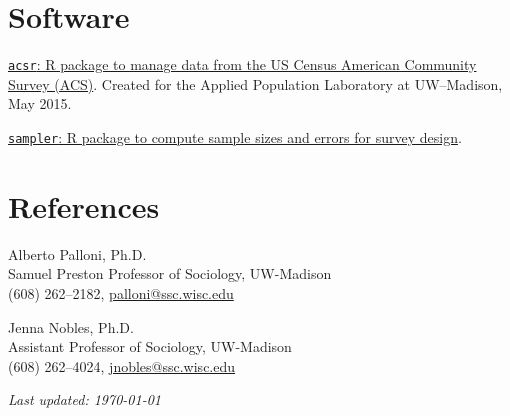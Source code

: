 \documentclass[10pt,letterpaper]{article}
\renewenvironment{itemize}{
  \begin{list}{}{
    \setlength{\leftmargin}{1.5em}
    \setlength{\itemsep}{0.25em}
    \setlength{\parskip}{0pt}
    \setlength{\parsep}{0.25em}
  }
}{
  \end{list}
}
\begin{document}
\section*{Software}

\begin{itemize}
\item \href{https://github.com/sdaza/acsr}{\texttt{acsr}: R package to manage data from the US Census American Community Survey (ACS)}. Created for the Applied Population Laboratory at UW--Madison, May 2015.
\item \href{https://github.com/sdaza/sampler}{\texttt{sampler}: R package to compute sample sizes and errors for survey design}.
\end{itemize}

\section*{References}

\begin{itemize}
\item Alberto Palloni, Ph.D.\\
Samuel Preston Professor of Sociology, UW-Madison\\
(608) 262--2182, \href{mailto:palloni@ssc.wisc.edu}{palloni@ssc.wisc.edu}

\item Jenna Nobles, Ph.D.\\
Assistant Professor of Sociology, UW-Madison\\
(608) 262--4024, \href{mailto:jnobles@ssc.wisc.edu}{jnobles@ssc.wisc.edu}
\end{itemize}

\bigskip
\bigskip
\begin{center}
  \begin{small}
    \textit{Last updated: \today}
  \end{small}
\end{center}

\end{document}
